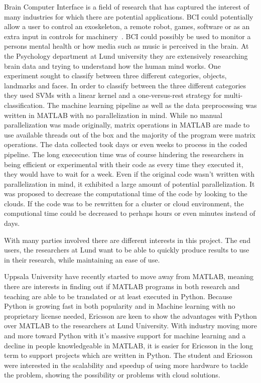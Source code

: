 \documentclass[12pt, a4paper]{article}
\begin{document}
Brain Computer Interface is a field of research that has captured the interest of many industries for which there are potential applications.
BCI could potentially allow a user to control an exoskeleton, a remote robot, games, software or as an extra input in controls for machinery~\cite{10.3389/fnins.2010.00198}.
BCI could possibly be used to monitor a persons mental health or how media such as music is perceived in the brain.
At the Psychology department at Lund university they are extensively researching brain data and trying to understand how the human mind works.
One experiment sought to classify between three different categories, objects, landmarks and faces.
In order to classify between the three different categories they used SVMs with a linear kernel and a one-versus-rest strategy for multi-classification.
The machine learning pipeline as well as the data preprocessing was written in MATLAB with no parallelization in mind.
While no manual parallelization was made originally, matrix operations in MATLAB are made to use available threads out of the box and the majority of the program were matrix operations.
The data collected took days or even weeks to process in the coded pipeline.
The long exececution time was of course hindering the researchers in being efficient or experimental with their code as every time they executed it, they would have to wait for a week.
Even if the original code wasn't written with parallelization in mind, it exhibited a large amount of potential parallelization.
It was proposed to decrease the computational time of the code by looking to the clouds.
If the code was to be rewritten for a cluster or cloud environment, the computional time could be decreased to perhaps hours or even minutes instead of days.

With many parties involved there are different interests in this project.
The end users, the researchers at Lund want to be able to quickly produce results to use in their research, while maintaining an ease of use.

Uppsala University have recently started to move away from MATLAB, meaning there are interests in finding out if MATLAB programs in both research and teaching are able to be translated or at least executed in Python.
Because Python is growing fast in both popularity and in Machine learning with no proprietary license needed, Ericsson are keen to show the advantages with Python over MATLAB to the researchers at Lund University.
With industry moving more and more toward Python with it's massive support for machine learning and a decline in people knowledgeable in MATLAB, it is easier for Ericsson in the long term to support projects which are written in Python.
The student and Ericsson were interested in the scalability and speedup of using more hardware to tackle the problem, showing the possibility or problems with cloud solutions.
\end{document}
